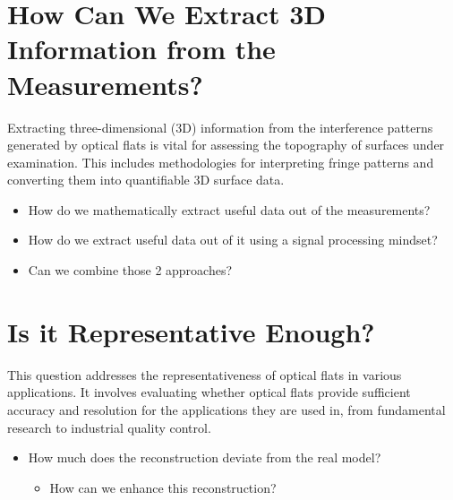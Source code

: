 \documentclass[../main.tex]{subfiles}
\begin{document}
\section{How Can We Extract 3D Information from the Measurements?}
Extracting three-dimensional (3D) information from the interference patterns generated by optical flats is vital for assessing the topography of surfaces under examination. This includes methodologies for interpreting fringe patterns and converting them into quantifiable 3D surface data.
\begin{itemize}
    \item How do we mathematically extract useful data out of the measurements?
    \item How do we extract useful data out of it using a signal processing mindset?
    \item Can we combine those 2 approaches?
\end{itemize}

\section{Is it Representative Enough?}
This question addresses the representativeness of optical flats in various applications. It involves evaluating whether optical flats provide sufficient accuracy and resolution for the applications they are used in, from fundamental research to industrial quality control.
\begin{itemize}
    \item How much does the reconstruction deviate from the real model?
    \begin{itemize}
        \item How can we enhance this reconstruction?
    \end{itemize}
\end{itemize}
\end{document}
